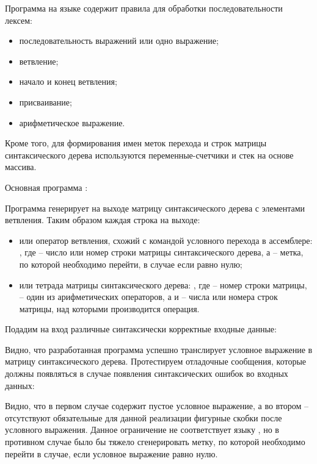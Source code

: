 Программа на языке  содержит правила для обработки последовательности лексем:

\begin{itemize}
	\item последовательность выражений или одно выражение;
	\item ветвление;
	\item начало и конец ветвления;
	\item присваивание;
	\item арифметическое выражение.
\end{itemize}

Кроме того, для формирования имен меток перехода и строк матрицы синтаксического дерева используются переменные-счетчики и стек на основе массива.


Основная программа :


Программа генерирует на выходе матрицу синтаксического дерева с элементами ветвления. Таким образом каждая строка на выходе:

\begin{itemize}
	\item или оператор ветвления, схожий с командой условного перехода в ассемблере: , где  -- число или номер строки матрицы синтаксического дерева, а  -- метка, по которой необходимо перейти, в случае если  равно нулю;
	\item или тетрада матрицы синтаксического дерева: , где  -- номер строки матрицы,  -- один из арифметических операторов, а  и  -- числа или номера строк матрицы, над которыми производится операция. 
\end{itemize}

Подадим на вход различные синтаксически корректные входные данные:




Видно, что разработанная программа успешно транслирует условное выражение в матрицу синтаксического дерева. Протестируем отладочные сообщения, которые должны появляться в случае появления синтаксических ошибок во входных данных:



Видно, что в первом случае  содержит пустое условное выражение, а во втором -- отсутствуют обязательные для данной реализации фигурные скобки после условного выражения. Данное ограничение не соответствует языку , но в противном случае было бы тяжело сгенерировать метку, по которой необходимо перейти в случае, если условное выражение равно нулю.

